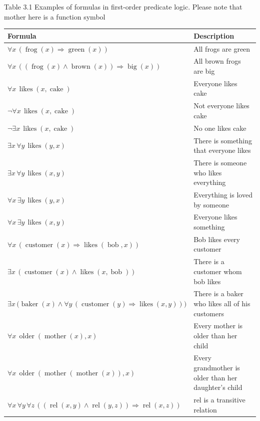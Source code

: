 \documentclass[10pt]{book}
\begin{document}
Table 3.1 Examples of formulas in first-order predicate logic. Please note that mother here is a function symbol
\begin{center}
\begin{tabular}{|l|l|}
\hline
Formula & Description \\
\hline
$\forall x\, (\operatorname{frog}(x) \Rightarrow \operatorname{green}(x))$ & All frogs are green \\
\hline
$\forall x\, ((\operatorname{frog}(x) \wedge \operatorname{brown}(x)) \Rightarrow \operatorname{big}(x))$ & All brown frogs are big \\
\hline
$\forall x\, \operatorname{likes}(x,\operatorname{cake})$ & Everyone likes cake \\
\hline
$\neg \forall x\, \operatorname{likes}(x,\operatorname{cake})$ & Not everyone likes cake \\
\hline
$\neg \exists x\, \operatorname{likes}(x,\operatorname{cake})$ & No one likes cake \\
\hline
$\exists x\, \forall y\, \operatorname{likes}(y,x)$ & There is something that everyone likes \\
\hline
$\exists x\, \forall y\, \operatorname{likes}(x,y)$ & There is someone who likes everything \\
\hline
$\forall x\, \exists y\, \operatorname{likes}(y,x)$ & Everything is loved by someone \\
\hline
$\forall x\, \exists y\, \operatorname{likes}(x,y)$ & Everyone likes something \\
\hline
$\forall x\, (\operatorname{customer}(x) \Rightarrow \operatorname{likes}(\operatorname{bob},x))$ & Bob likes every customer \\
\hline
$\exists x\, (\operatorname{customer}(x) \wedge \operatorname{likes}(x,\operatorname{bob}))$ & There is a customer whom bob likes \\
\hline
$\exists x\, \big(\operatorname{baker}(x) \wedge \forall y\, (\operatorname{customer}(y) \Rightarrow \operatorname{likes}(x,y))\big)$ & There is a baker who likes all of his customers \\
\hline
$\forall x\, \operatorname{older}(\operatorname{mother}(x),x)$ & Every mother is older than her child \\
\hline
$\forall x\, \operatorname{older}(\operatorname{mother}(\operatorname{mother}(x)),x)$ & Every grandmother is older than her daughter's child \\
\hline
$\forall x\, \forall y\, \forall z\, ((\operatorname{rel}(x,y) \wedge \operatorname{rel}(y,z)) \Rightarrow \operatorname{rel}(x,z))$ & rel is a transitive relation \\
\hline
\end{tabular}
\end{center}
\end{document}
